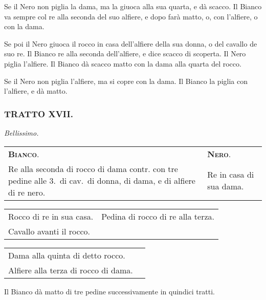 \documentclass[11pt,a6paper]{article}
\begin{document}
Se il Nero non piglia la dama, ma la giuoca alla sua
quarta, e dà scacco. Il Bianco va sempre col re
alla seconda del suo alfiere, e dopo farà matto, o,
con l'alfiere, o con la dama.

Se poi il Nero giuoca il rocco in casa dell'alfiere
della sua donna, o del cavallo de suo re. Il Bianco
re alla seconda dell'alfiere, e dice scacco di
scoperta. Il Nero piglia l'alfiere. Il Bianco dà
scacco matto con la dama alla quarta del rocco.

Se il Nero non piglia l'alfiere, ma si copre con la
dama. Il Bianco la piglia con l'alfiere, e dà matto.


\subsubsection{TRATTO XVII.}
\hfill\textit{\footnotesize Bellissimo.}
{\small
\noindent\begin{tabular}{@{}p{3.84cm}p{3.84cm}}
 {\bfseries\scshape Bianco}. & {\bfseries\scshape Nero}.\\

Re alla seconda di rocco
di dama contr. con tre
pedine alle 3.\ di cav.\ di
donna, di dama, e di
alfiere di re nero. &Re in casa di sua dama.\\
\end{tabular}

\noindent\begin{tabular}{@{}p{3.84cm}p{3.84cm}}
Rocco di re in sua casa. &Pedina di rocco di re alla terza.\\
Cavallo avanti il rocco.&\\
\end{tabular}

\noindent\begin{tabular}{@{}p{3.84cm}p{3.84cm}}
Dama alla quinta di detto rocco.&\\
Alfiere alla terza di rocco di dama.&\\
\end{tabular}
}



Il Bianco dà matto di tre pedine successivamente in
quindici tratti.
\end{document}
